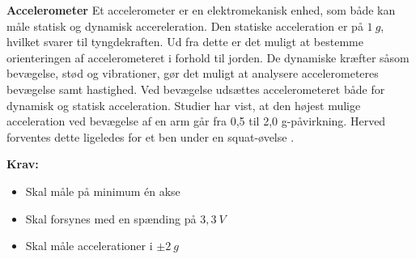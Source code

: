 \textbf{Accelerometer}
Et accelerometer er en elektromekanisk enhed, som både kan måle statisk og dynamisk accereleration. Den statiske acceleration er på $1~g$, hvilket svarer til tyngdekraften. Ud fra dette er det muligt at bestemme orienteringen af accelerometeret i forhold til jorden. De dynamiske kræfter såsom bevægelse, stød og vibrationer, gør det muligt at analysere accelerometeres bevægelse samt hastighed. Ved bevægelse udsættes accelerometeret både for dynamisk og statisk acceleration. Studier har vist, at den højest mulige acceleration ved bevægelse af en arm går fra 0,5 til 2,0 g-påvirkning. Herved forventes dette ligeledes for et ben under en squat-øvelse \citep{bernmarka2002}. 
\vspace{3mm}

\textbf{Krav:}
\begin{itemize}
\item Skal måle på minimum én akse
\item Skal forsynes med en spænding på $3,3~V$
\item Skal måle accelerationer i $\pm2~g$
\end{itemize}
